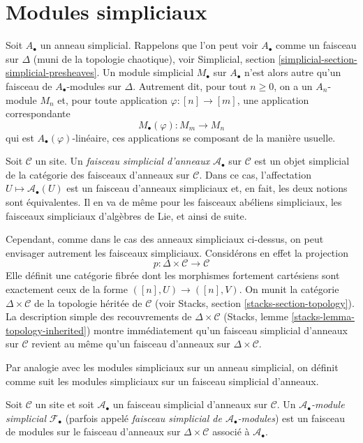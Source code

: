 \section{Modules simpliciaux}
\label{section-simplicial-modules}

\noindent
Soit $A_\bullet$ un anneau simplicial. Rappelons que l'on peut voir
$A_\bullet$ comme un faisceau sur $\Delta$ (muni de la topologie chaotique),
voir Simplicial, section
\ref{simplicial-section-simplicial-presheaves}. Un module simplicial
$M_\bullet$ sur $A_\bullet$ n'est alors autre qu'un faisceau de
$A_\bullet$-modules sur $\Delta$. Autrement dit, pour tout $n \geq 0$, on a
un $A_n$-module $M_n$ et, pour toute application
$\varphi : [n] \to [m]$, une application correspondante
$$
M_\bullet(\varphi) : M_m \longrightarrow M_n
$$
qui est $A_\bullet(\varphi)$-linéaire, ces applications se composant de la
manière usuelle.

\medskip\noindent
Soit $\mathcal{C}$ un site. Un {\it faisceau simplicial d'anneaux}
$\mathcal{A}_\bullet$ sur $\mathcal{C}$ est un objet simplicial de la
catégorie des faisceaux d'anneaux sur $\mathcal{C}$. Dans ce cas,
l'affectation $U \mapsto \mathcal{A}_\bullet(U)$ est un faisceau d'anneaux
simpliciaux et, en fait, les deux notions sont équivalentes. Il en va de même
pour les faisceaux abéliens simpliciaux, les faisceaux simpliciaux d'algèbres
de Lie, et ainsi de suite.

\medskip\noindent
Cependant, comme dans le cas des anneaux simpliciaux ci-dessus, on peut
envisager autrement les faisceaux simpliciaux. Considérons en effet la
projection
$$
p : \Delta \times \mathcal{C} \longrightarrow \mathcal{C}
$$
Elle définit une catégorie fibrée dont les morphismes fortement cartésiens
sont exactement ceux de la forme $([n], U) \to ([n], V)$. On munit la
catégorie $\Delta \times \mathcal{C}$ de la topologie héritée de
$\mathcal{C}$ (voir Stacks, section \ref{stacks-section-topology}). La
description simple des recouvrements de $\Delta \times \mathcal{C}$
(Stacks, lemme \ref{stacks-lemma-topology-inherited}) montre immédiatement
qu'un faisceau simplicial d'anneaux sur $\mathcal{C}$ revient au même qu'un
faisceau d'anneaux sur $\Delta \times \mathcal{C}$.

\medskip\noindent
Par analogie avec les modules simpliciaux sur un anneau simplicial, on
définit comme suit les modules simpliciaux sur un faisceau simplicial
d'anneaux.

\begin{definition}
\label{definition-simplicial-module}
Soit $\mathcal{C}$ un site et soit $\mathcal{A}_\bullet$ un faisceau
simplicial d'anneaux sur $\mathcal{C}$. Un
{\it $\mathcal{A}_\bullet$-module simplicial} $\mathcal{F}_\bullet$
(parfois appelé {\it faisceau simplicial de
$\mathcal{A}_\bullet$-modules}) est un faisceau de modules sur le faisceau
d'anneaux sur $\Delta \times \mathcal{C}$ associé à
$\mathcal{A}_\bullet$.
\end{definition}

